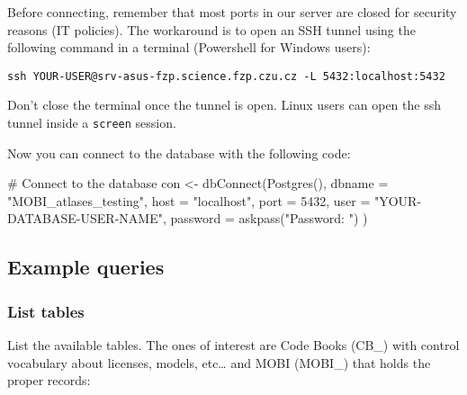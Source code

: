 \documentclass[
  letterpaper,
  DIV=11,
  numbers=noendperiod]{scrartcl}
\newenvironment{Shaded}{\begin{snugshade}}{\end{snugshade}}
\newcommand{\AttributeTok}[1]{\textcolor[rgb]{0.40,0.45,0.13}{#1}}
\newcommand{\CommentTok}[1]{\textcolor[rgb]{0.37,0.37,0.37}{#1}}
\newcommand{\DecValTok}[1]{\textcolor[rgb]{0.68,0.00,0.00}{#1}}
\newcommand{\FunctionTok}[1]{\textcolor[rgb]{0.28,0.35,0.67}{#1}}
\newcommand{\NormalTok}[1]{\textcolor[rgb]{0.00,0.23,0.31}{#1}}
\newcommand{\OtherTok}[1]{\textcolor[rgb]{0.00,0.23,0.31}{#1}}
\newcommand{\SpecialCharTok}[1]{\textcolor[rgb]{0.37,0.37,0.37}{#1}}
\newcommand{\StringTok}[1]{\textcolor[rgb]{0.13,0.47,0.30}{#1}}
\begin{document}
Before connecting, remember that most ports in our server are closed for
security reasons (IT policies). The workaround is to open an SSH tunnel
using the following command in a terminal (Powershell for Windows
users):

\begin{verbatim}
ssh YOUR-USER@srv-asus-fzp.science.fzp.czu.cz -L 5432:localhost:5432
\end{verbatim}

Don't close the terminal once the tunnel is open. Linux users can open
the ssh tunnel inside a \texttt{screen} session.

Now you can connect to the database with the following code:

\begin{Shaded}
\begin{Highlighting}[]
\CommentTok{\# Connect to the database}
\NormalTok{con }\OtherTok{\textless{}{-}} \FunctionTok{dbConnect}\NormalTok{(}\FunctionTok{Postgres}\NormalTok{(),}
  \AttributeTok{dbname =} \StringTok{"MOBI\_atlases\_testing"}\NormalTok{,}
  \AttributeTok{host =} \StringTok{"localhost"}\NormalTok{,}
  \AttributeTok{port =} \DecValTok{5432}\NormalTok{,}
  \AttributeTok{user =} \StringTok{"YOUR{-}DATABASE{-}USER{-}NAME"}\NormalTok{,}
  \AttributeTok{password =} \FunctionTok{askpass}\NormalTok{(}\StringTok{"Password: "}\NormalTok{)}
\NormalTok{)}
\end{Highlighting}
\end{Shaded}

\subsection{Example queries}\label{example-queries}

\subsubsection{List tables}\label{list-tables}

List the available tables. The ones of interest are Code Books (CB\_)
with control vocabulary about licenses, models, etc\ldots{} and MOBI
(MOBI\_) that holds the proper records:

\begin{Shaded}
\end{Shaded}
\end{document}
